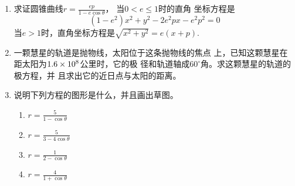 \begin{ex}
\begin{enumerate}
    \item 求证圆锥曲线$r=\frac{ep}{1-e\cos\theta}$，
    当$0<e\le 1$时的直角
    坐标方程是
    \[(1-e^2)x^2+y^2-2e^2px-e^2p^2=0\]
    当$e>1$时，直角坐标方程是$\sqrt{x^2+y^2}=e(x+p)$.
    \item 一颗慧星的轨道是抛物线，太阳位于这条抛物线的焦点
    上，已知这颗慧星在距太阳为$1.6\times10^8$公里时，它的极
    径和轨道轴成$60^{\circ}$角。求这颗慧星的轨道的极方程，并
    且求出它的近日点与太阳的距离。
    \item 说明下列方程的图形是什么，并且画出草图。
\begin{multicols}{2}
    \begin{enumerate}
        \item $r=\frac{5}{1-\cos\theta}$
        \item $r=\frac{5}{3-4\cos\theta}$
        \item $r=\frac{1}{2-\cos\theta}$
        \item $r=\frac{4}{1+\cos\theta}$
    \end{enumerate}
\end{multicols}
\end{enumerate}
\end{ex}

